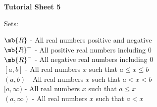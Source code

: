 

\begin{center}
  \textbf{Tutorial Sheet 5}
\end{center}
Sets:\begin{multicols}{2}\small
  $\quad$\\
  $\mb{R}$ - All real numbers positive and negative\\
    $\mb{R}^+$ - All positive real numbers including $0$\\
    $\mb{R}^-$ - All negative real numbers including $0$
    \columnbreak
    \\$[a,b]$ - All real numbers $x$ such that $a \le x \le b$\\
    $(a,b)$ - All real numbers $x$ such that $a < x < b$\\
    $[a,\infty)$ - All real numbers $x$ such that $a \le x$\\
    $(a,\infty)$ - All real numbers $x$ such that $a < x$
  \end{multicols}
